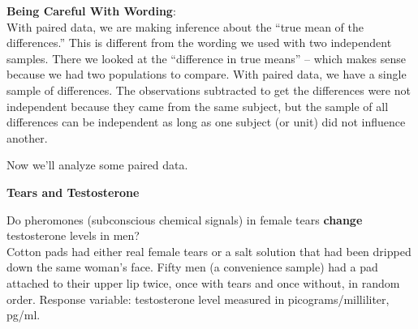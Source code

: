   {\bf Being Careful With Wording}:\\
  With paired data, we are making inference about the ``true mean of
  the differences.''  This is different from the wording we used with
  two independent samples. There we looked at the ``difference in true
  means'' -- which makes sense because we had two populations to
  compare. With paired data, we have a single sample of
  differences. The observations subtracted to get the differences were
  not independent because they came from the same subject, but the
  sample of all differences can be independent as long as one subject
  (or unit) did not influence another. 



   Now we'll analyze some paired data.

   \begin{center}
     {\large\bf Tears and Testosterone}
   \end{center}
    Do pheromones (subconscious chemical signals) in female
      tears {\bf change}  testosterone levels in men?\\
    Cotton pads had either real female tears or a salt solution
      that had been dripped down the same woman's face.
    Fifty men (a convenience sample) had a pad attached to their upper
    lip twice, once 
      with tears and once without, in random order.
    Response variable: testosterone level measured in
      picograms/milliliter, pg/ml.

